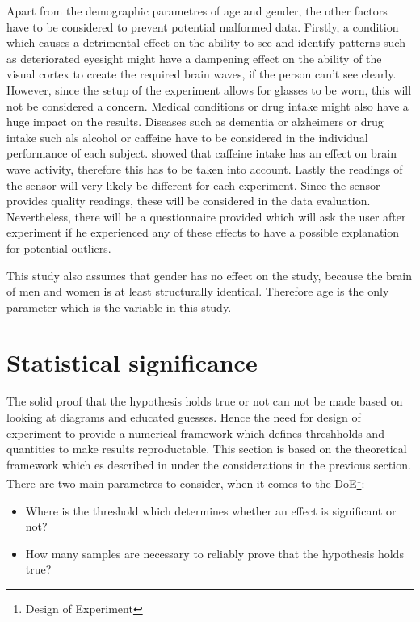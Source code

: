             Apart from the demographic parametres of age and gender, the other factors have to be considered to prevent potential malformed data. Firstly, a condition which causes a detrimental effect on the ability to see and identify patterns such as deteriorated eyesight might have a dampening effect on the ability of the visual cortex to create the required brain waves, if the person can't see clearly. However, since the setup of the experiment allows for glasses to be worn, this will not be considered a concern. 
            Medical conditions or drug intake might also have a huge impact on the results. Diseases such as dementia or alzheimers or drug intake such als alcohol or caffeine have to be considered in the individual performance of each subject. \cite{Kenemans.1995} showed that caffeine intake has an effect on brain wave activity, therefore this has to be taken into account.
            Lastly the readings of the sensor will very likely be different for each experiment. Since the sensor provides quality readings, these will be considered in the data evaluation. Nevertheless, there will be a questionnaire provided which will ask the user after experiment if he experienced any of these effects to have a possible explanation for potential outliers.

            \medskip

            This study also assumes that gender has no effect on the study, because the brain of men and women is at least structurally identical. Therefore age is the only parameter which is the variable in this study.

        \section{Statistical significance}\label{doe}

            The solid proof that the hypothesis holds true or not can not be made based on looking at diagrams and educated guesses. Hence the need for design of experiment to provide a numerical framework which defines threshholds and quantities to make results reproductable. This section is based on the theoretical framework which es described in \cite[87ff]{Siebertz.2017} under the considerations in the previous section.
            There are two main parametres to consider, when it comes to the DoE\footnote{Design of Experiment}: 
            
            \begin{itemize}
                \item Where is the threshold which determines whether an effect is significant or not?
                \item How many samples are necessary to reliably prove that the hypothesis holds true?
            \end{itemize}

